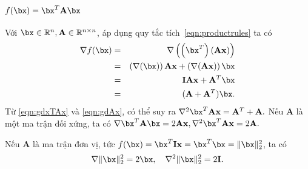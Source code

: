 \subsection{$f(\bx) = \bx^T\mathbf{A} \bx$}
Với $\bx \in \mathbb{R}^n, \mathbf{A} \in \mathbb{R}^{n\times n}$, áp dụng quy
tắc tích~\eqref{eqn:productrules} ta có
\begin{eqnarray}
    \nonumber
    \nabla f(\bx) &=& \nabla \left(\left(\bx^T\right) \left(\mathbf{Ax}\right)\right) \\\
                \nonumber
                     &=& \left(\nabla (\bx)\right) \mathbf{Ax} + \left(\nabla (\mathbf{Ax})\right)\bx \\\
                    \nonumber
                     & = & \mathbf{IAx} + \mathbf{A}^T\bx \\\
                     \label{eqn:gdxTAx}
                     & = & (\mathbf{A} + \mathbf{A}^T)\bx.
\end{eqnarray}
Từ \eqref{eqn:gdxTAx} và \eqref{eqn:gdAx}, có thể suy ra
\begin{math}
\nabla^2 \bx^T\mathbf{Ax} = \mathbf{A}^T + \mathbf{A}.
\end{math}
Nếu $\mathbf{A}$ là một ma trận đối xứng, ta có
$
\nabla \bx^T\mathbf{A}\bx = 2\mathbf{Ax},
\nabla^2 \bx^T\mathbf{Ax} = 2\mathbf{A}.
$

Nếu $\mathbf{A}$ là ma trận đơn vị, tức $f(\bx) = \bx^T\mathbf{Ix} = \bx^T\bx = \|\bx\|_2^2$, ta có
\begin{equation}
\nabla \|\bx\|_2^2 = 2\bx,~~~
\nabla^2 \|\bx\|_2^2 = 2\mathbf{I}.
\end{equation}



